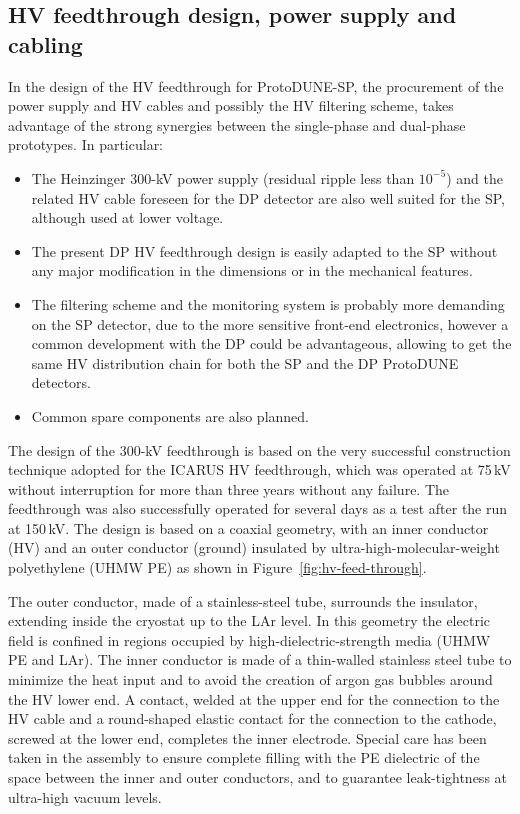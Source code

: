 \subsection{HV feedthrough design, power supply and cabling}
In the design of the HV feedthrough for ProtoDUNE-SP, the procurement of the power supply and HV cables and possibly the HV filtering scheme, takes advantage of the strong synergies between the single-phase and dual-phase prototypes. In particular:

\begin{itemize}	
\item The Heinzinger 300-kV power supply (residual ripple less than $10^{-5}$) and the related HV cable foreseen for the DP detector are also well suited for the SP, although used at lower voltage.
\item The present DP HV feedthrough design is easily adapted to the SP without any major modification in the dimensions or in the mechanical features.
\item The filtering scheme and the monitoring system is probably more demanding on the SP detector, due to the more sensitive front-end electronics, however a common development with the DP could be advantageous, allowing to get the same HV distribution chain for both the SP and the DP ProtoDUNE detectors.
\item Common spare components are also planned. %
\end{itemize}

The %
design of the 300-kV feedthrough is based on the very successful construction technique adopted for the ICARUS HV feedthrough, which was operated at 75\,kV without interruption for more than three years without any failure. The feedthrough was also successfully operated for several days as a test after the run at 150\,kV.  
The design is based on a coaxial geometry, with an inner conductor (HV) and an outer conductor (ground) insulated by ultra-high-molecular-weight polyethylene (UHMW PE)  as shown in Figure~\ref{fig:hv-feed-through}. 

The outer conductor, made of a stainless-steel tube, surrounds the insulator, extending inside the cryostat up to the LAr level. %
In this geometry the electric field is %
confined in regions occupied by high-dielectric-strength media (UHMW PE and LAr).  The inner conductor is made of a thin-walled stainless steel tube to minimize the heat input and to avoid the creation of argon gas bubbles around the HV lower end. A contact, welded at the upper end for the
connection to the HV cable and a round-shaped elastic contact for the connection to the cathode, screwed at the lower end, completes the inner electrode. Special care has been taken in the assembly to ensure complete filling with the PE dielectric of the space between the inner and outer conductors, and to guarantee leak-tightness at ultra-high vacuum levels.


